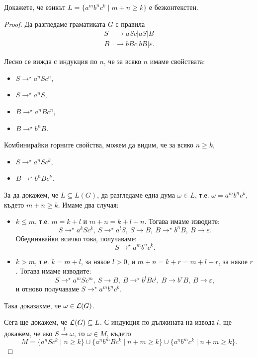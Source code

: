\begin{problem}
  Докажете, че езикът $L = \{a^mb^nc^k\mid m+n \geq k\}$ е безконтекстен.
\end{problem}
\begin{proof}
  Да разгледаме граматиката $G$ с правила
  \begin{align*}
    S& \rightarrow aSc\vert aS \vert B\\
    B& \rightarrow bBc\vert bB\vert\varepsilon.
  \end{align*}
  
  Лесно се вижда с индукция по $n$, че за всяко $n$ имаме свойствата:
  \begin{itemize}
  \item 
    $S \rightarrow^\star a^nSc^n$,
  \item
    $S \rightarrow^\star a^nS$,
  \item
    $B \rightarrow^\star a^nBc^n$,
  \item
    $B \rightarrow^\star b^nB$.
  \end{itemize}
  Комбинирайки горните свойства, можем да видим, че за всяко $n \geq k$,
  \begin{itemize}
  \item 
    $S \rightarrow^\star a^nSc^k$,
  \item
    $B \rightarrow^\star b^nBc^k$.
  \end{itemize}
  За да докажем, че $L \subseteq L(G)$, 
  да разгледаме една дума $\omega \in L$, т.е. $\omega = a^mb^nc^k$, където $m+n \geq k$.
  Имаме два случая:
  \begin{itemize}
  \item 
    $k \leq m$, т.е. $m = k+l$ и $m+n = k+l+n$.
    Тогава имаме изводите:
    \[S \rightarrow^\star a^kSc^k,\ S \rightarrow^\star a^lS,\ S \rightarrow B,\ B \rightarrow^\star b^nB,\ B \rightarrow \varepsilon.\]
    Обединявайки всичко това, получаваме:
    \[S \rightarrow^\star a^mb^nc^k.\]
  \item
    $k > m$, т.е. $k = m+l$, за някое $l > 0$, и $m+n = k+r = m+l+r$, за някое $r$.
    Тогава имаме изводите:
    \[S \rightarrow^\star a^mSc^m,\ S\rightarrow B,\ B\rightarrow^\star b^lBc^l,\ B\rightarrow b^rB,\ B\rightarrow\varepsilon,\]
    и отново получаваме $S \rightarrow^\star a^mb^nc^k$.
  \end{itemize}
  Така доказахме, че $\omega \in \mathcal{L}(G)$.
  
  Сега ще докажем, че $\mathcal{L}(G) \subseteq L$.
  С индукция по дължината на извода $l$,
  ще докажем, че ако $S \stackrel{l}{\rightarrow}\omega$, то $\omega \in M$, където
  \[M = \{a^nSc^k\mid n\geq k\}\cup\{a^nb^mBc^k\mid n+m\geq k\}\cup\{a^nb^mc^k\mid n+m\geq k\}.\]
  

\end{proof}

